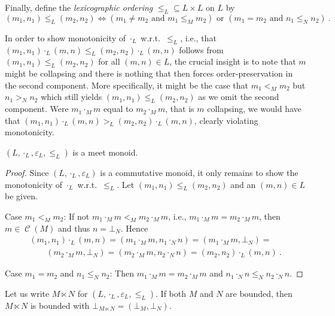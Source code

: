 \documentclass[english]{notes}
\DeclareMathOperator{\collapseset}{\mathcal{C}}
\begin{document}
Finally, define the \emph{lexicographic ordering} ${\leq_L} \subseteq
L \times L$ on $L$ by
%
\begin{equation*}
  (m_1, n_1) \leq_L (m_2, n_2)
\iff
  (m_1 \neq m_2 \text{ and } m_1 \leq_M m_2) \text{ or } (m_1 = m_2 \text{ and } n_1 \leq_N n_2)
\ \text{.}
\end{equation*}

In order to show monotonicity of $\cdot_L$ w.r.t.\ $\leq_L$, i.e.,
that $(m_1, n_1) \cdot_L (m, n) \leq_L (m_2, n_2) \cdot_L (m, n)$
follows from $(m_1, n_1) \leq_L (m_2, n_2)$ for all $(m, n) \in L$,
the crucial insight is to note that $m$ might be collapsing and there
is nothing that then forces order-preservation in the second
component. More specifically, it might be the case that $m_1 <_M m_2$
but $n_1 >_N n_2$ which still yields $(m_1, n_1) \leq_L (m_2, n_2)$ as
we omit the second component. Were $m_1 \cdot_M m$ equal to
$m_2 \cdot_M m$, that is $m$ collapsing, we would have that
$(m_1, n_1) \cdot_L (m, n) >_L (m_2, n_2) \cdot_L (m,n)$, clearly
violating monotonicity.

\begin{lemma}
$(L, {\cdot_L}, \varepsilon_L, {\leq_L})$ is a meet monoid.
\end{lemma}
\begin{proof}
Since $(L, {\cdot_L}, \varepsilon_L)$ is a commutative monoid, it only
remains to show the monotonicity of $\cdot_L$ w.r.t.\ $\leq_L$.  Let
$(m_1, n_1) \leq_L (m_2, n_2)$ and an $(m, n) \in L$ be given.

\smallskip%
Case $m_1 <_M m_2$: If not $m_1 \cdot_M m <_M m_2 \cdot_M m$, i.e., $m_1
\cdot_M m = m_2 \cdot_M m$, then $m \in \collapseset(M)$ and thus $n =
\bot_N$.  Hence
\begin{gather*}
  (m_1, n_1) \cdot_L (m, n)
=
  (m_1 \cdot_M m, n_1 \cdot_N n)
=
  (m_1 \cdot_M m, \bot_N)
={}\\\qquad
  (m_2 \cdot_M m, \bot_N)
=
  (m_2 \cdot_M m, n_2 \cdot_N n)
=
  (m_2, n_2) \cdot_L (m, n)
\ \text{.}
\end{gather*}

\smallskip%
Case $m_1 = m_2$ and $n_1 \leq_N n_2$: Then $m_1 \cdot_M m = m_2 \cdot_M m$
and $n_1 \cdot_N n \leq_N n_2 \cdot_N n$.
\end{proof}

Let us write $M \ltimes N$ for
$(L, {\cdot_L}, \varepsilon_L, {\leq_L})$.  If both $M$ and $N$ are
bounded, then $M \ltimes N$ is bounded with
$\bot_{M \ltimes N} = (\bot_M, \bot_N)$.
\end{document}
